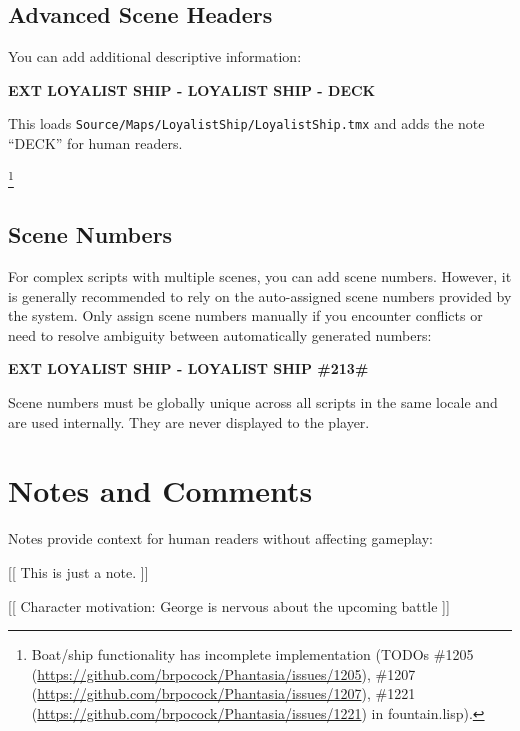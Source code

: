 \documentclass[11pt,letterpaper,oldstylefigures]{memoir}
\newcommand{\slugline}[1]{\nobreak\textbf{\MakeUppercase{#1}}\par\nobreak\vspace{1\baselineskip}}
\newcommand{\stagedir}[1]{#1\par\vspace{1\baselineskip}}
\newenvironment{FountainExample}
  {\begingroup
  \ttfamily\small
   \setlength{\parindent}{0pt}
  \setlength{\parskip}{0.5em}
  \allowdisplaybreaks
  \setlength{\displaywidowpenalty}{0}
  \setlength{\widowpenalty}{0}
  \setlength{\clubpenalty}{0}
  \setlength{\interlinepenalty}{0}
}
  {\endgroup}
\newcommand{\paragraphbreak}{\vspace{0.5em}}
\begin{document}
\subsection{Advanced Scene Headers}
\paragraphbreak

You can add additional descriptive information:

\begin{FountainExample}
\slugline{EXT LOYALIST SHIP - LOYALIST SHIP - DECK}
\end{FountainExample}

This loads \texttt{Source/Maps/LoyalistShip/LoyalistShip.tmx} and adds the note ``DECK'' for human readers.

\footnote{Boat/ship functionality has incomplete implementation (TODOs \#1205 (\href{https://github.com/brpocock/Phantasia/issues/1205}{https://github.com/brpocock/Phantasia/issues/1205}), \#1207 (\href{https://github.com/brpocock/Phantasia/issues/1207}{https://github.com/brpocock/Phantasia/issues/1207}), \#1221 (\href{https://github.com/brpocock/Phantasia/issues/1221}{https://github.com/brpocock/Phantasia/issues/1221}) in fountain.lisp).}

\subsection{Scene Numbers}
\paragraphbreak

For complex scripts with multiple scenes, you can add scene numbers. However, it is generally recommended to rely on the auto-assigned scene numbers provided by the system. Only assign scene numbers manually if you encounter conflicts or need to resolve ambiguity between automatically generated numbers:

\begin{FountainExample}
\slugline{EXT LOYALIST SHIP - LOYALIST SHIP \#213\#}
\end{FountainExample}

Scene numbers must be globally unique across all scripts in the same locale and are used internally.
They are never displayed to the player.

\section{Notes and Comments}
\paragraphbreak

Notes provide context for human readers without affecting gameplay:

\begin{FountainExample}
\stagedir{[[ This is just a note. ]]}
\stagedir{[[ Character motivation: George is nervous about the upcoming battle ]]}
\end{FountainExample}
\end{document}
